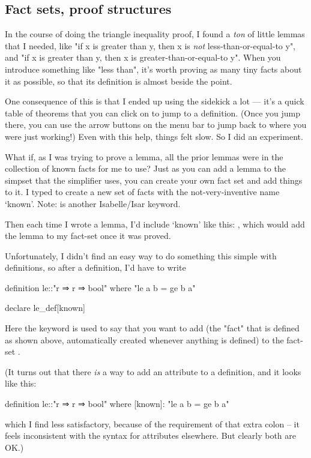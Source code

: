 \subsection{Fact sets, proof structures}
In the course of doing the triangle inequality proof, I found a \textit{ton} of little lemmas that I needed, like "if x is greater than y, then x is \textit{not} less-than-or-equal-to y", and "if x is greater than y, then x is greater-than-or-equal-to y". When you introduce something like "less than", it's worth proving as many tiny facts about it as possible, so that its definition is almost beside the point. 

One consequence of this is that I ended up using the sidekick a lot --- it's a quick table of theorems that you can click on to jump to a definition. (Once you jump there, you can use the arrow buttons on the menu bar to jump back to where you were just working!) Even with this help, things felt slow. So I did an experiment. 

What if, as I was trying to prove a lemma, all the prior lemmas were in the collection of known facts for me to use? Just as you can add a lemma to the simpset that the simplifier uses, you can create your own fact set and add things to it. I typed  to create a new set of facts with the not-very-inventive name `known'. Note:  is another Isabelle/Isar keyword. 

Then each time I wrote a lemma, I'd include `known' like this: , which would add the lemma  to my fact-set once it was proved. 

Unfortunately, I didn't find an easy way to do something this simple with definitions, so after a definition, I'd have to write
\begin{IS}
definition le::"r ⇒ r ⇒ bool"
  where "le a b = ge b a" 

declare le_def[known]
\end{IS}
Here the keyword  is used to say that you want to add  (the "fact" that  is defined as shown above, automatically created whenever anything is defined) to the fact-set . 

(It turns out that there \textit{is} a way to add an attribute to a definition, and it looks like this:
\begin{IS}
definition le::"r ⇒ r ⇒ bool"
  where [known]: "le a b = ge b a" 
\end{IS}
which I find less satisfactory, because of the requirement of that extra colon -- it feels inconsistent with the syntax for attributes elsewhere. But clearly both are OK.)

